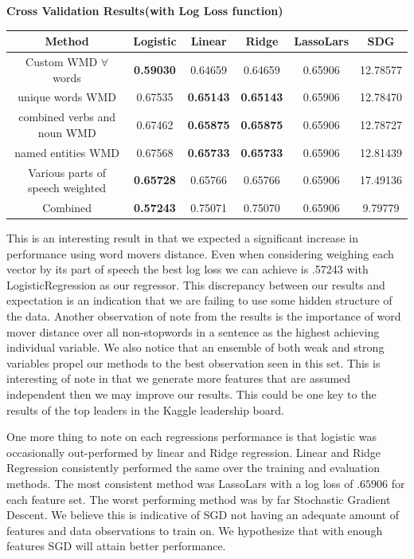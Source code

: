 \documentclass{article} %
\begin{document}
	\begin{center}
		\textbf{Cross Validation Results(with Log Loss function)}
		
		\begin{tabular}{|c|c|c|c|c|c|} \hline
			Method & Logistic & Linear & Ridge & LassoLars & SDG \\ \hline
			Custom WMD $\forall$ words & \textbf{0.59030} & 0.64659 & 0.64659 & 0.65906 & 12.78577 \\ \hline
			unique words WMD & 0.67535 & \textbf{0.65143} & \textbf{0.65143} & 0.65906 & 12.78470 \\ \hline
			combined verbs and noun WMD & 0.67462 & \textbf{0.65875} & \textbf{0.65875} & 0.65906 & 12.78727 \\ \hline
			named entities WMD & 0.67568 & \textbf{0.65733} & \textbf{0.65733} & 0.65906 & 12.81439 \\ \hline
			Various parts of speech weighted & \textbf{0.65728} & 0.65766 & 0.65766 & 0.65906 & 17.49136\\ \hline
			Combined & \textbf{0.57243} & 0.75071 & 0.75070 & 0.65906 & 9.79779 \\ \hline
		\end{tabular}
	\end{center}
	This is an interesting result in that we expected a significant increase in performance using word movers distance. Even when considering weighing each vector by its part of speech the best log loss we can achieve is .57243 with LogisticRegression as our regressor. This discrepancy between our results and expectation is an indication that we are failing to use some hidden structure of the data. Another observation of note from the results is the importance of word mover distance over all non-stopwords in a sentence as the highest achieving individual variable. We also notice that an ensemble of both weak and strong variables propel our methods to the best observation seen in this set. This is interesting of note in that we generate more features that are assumed independent then we may improve our results. This could be one key to the results of the top leaders in the Kaggle leadership board.
	
	One more thing to note on each regressions performance is that logistic was occasionally out-performed by linear and Ridge regression. Linear and Ridge Regression consistently performed the same over the training and evaluation methods. The most consistent method was LassoLars with a log loss of $.65906$ for each feature set. The worst performing method was by far Stochastic Gradient Descent. We believe this is indicative of SGD not having an adequate amount of features and data observations to train on. We hypothesize that with enough features SGD will attain better performance.
	
\end{document}
